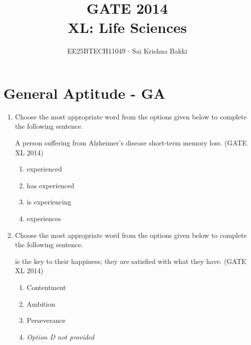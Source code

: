 \documentclass[journal,12pt,onecolumn]{IEEEtran}
\theoremstyle{remark}
\begin{document}
\title{
 GATE 2014 \\
XL: Life Sciences}
\author{EE25BTECH11049 - Sai Krishna Bakki}
\date{}
\maketitle

\section*{\textbf{General Aptitude - GA}}

\begin{enumerate}
    \item Choose the most appropriate word from the options given below to complete the following sentence.
    \par
    A person suffering from Alzheimer's disease \underline{\hspace{2cm}} short-term memory loss.
    \hfill (GATE XL 2014)\\
    \begin{multicols}{2}
        \begin{enumerate}
            \item experienced
            \item has experienced
            \item is experiencing
            \item experiences
        \end{enumerate}
    \end{multicols}

    \item Choose the most appropriate word from the options given below to complete the following sentence.
    \par
    \underline{\hspace{2cm}} is the key to their happiness; they are satisfied with what they have.
    \hfill (GATE XL 2014)\\
    \begin{multicols}{2}
        \begin{enumerate}
            \item Contentment
            \item Ambition
            \item Perseverance
            \item \textit{Option D not provided}
        \end{enumerate}
    \end{multicols}


\end{enumerate}
\end{document}
